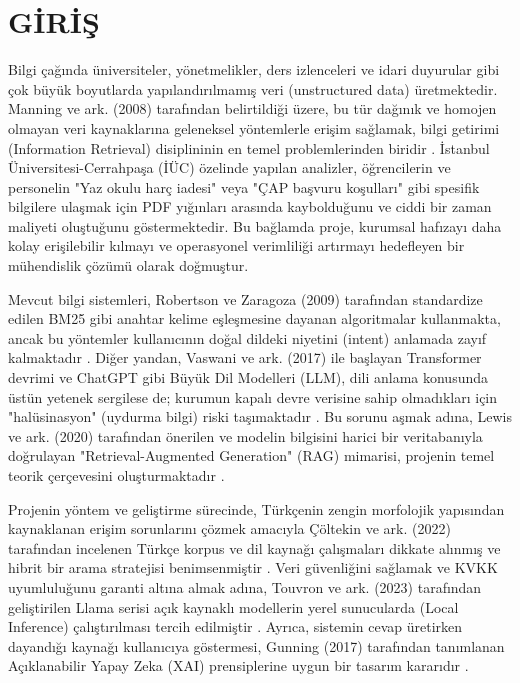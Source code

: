 \documentclass[12pt,a4paper]{report}
\begin{document}
\chapter{GİRİŞ}

Bilgi çağında üniversiteler, yönetmelikler, ders izlenceleri ve idari duyurular gibi çok büyük boyutlarda yapılandırılmamış veri (unstructured data) üretmektedir. Manning ve ark. (2008) tarafından belirtildiği üzere, bu tür dağınık ve homojen olmayan veri kaynaklarına geleneksel yöntemlerle erişim sağlamak, bilgi getirimi (Information Retrieval) disiplininin en temel problemlerinden biridir \cite{manning2008introduction}. İstanbul Üniversitesi-Cerrahpaşa (İÜC) özelinde yapılan analizler, öğrencilerin ve personelin "Yaz okulu harç iadesi" veya "ÇAP başvuru koşulları" gibi spesifik bilgilere ulaşmak için PDF yığınları arasında kaybolduğunu ve ciddi bir zaman maliyeti oluştuğunu göstermektedir. Bu bağlamda proje, kurumsal hafızayı daha kolay erişilebilir kılmayı ve operasyonel verimliliği artırmayı hedefleyen bir mühendislik çözümü olarak doğmuştur.

Mevcut bilgi sistemleri, Robertson ve Zaragoza (2009) tarafından standardize edilen BM25 gibi anahtar kelime eşleşmesine dayanan algoritmalar kullanmakta, ancak bu yöntemler kullanıcının doğal dildeki niyetini (intent) anlamada zayıf kalmaktadır \cite{robertson2009probabilistic}. Diğer yandan, Vaswani ve ark. (2017) ile başlayan Transformer devrimi ve ChatGPT gibi Büyük Dil Modelleri (LLM), dili anlama konusunda üstün yetenek sergilese de; kurumun kapalı devre verisine sahip olmadıkları için "halüsinasyon" (uydurma bilgi) riski taşımaktadır \cite{ji2023survey}. Bu sorunu aşmak adına, Lewis ve ark. (2020) tarafından önerilen ve modelin bilgisini harici bir veritabanıyla doğrulayan "Retrieval-Augmented Generation" (RAG) mimarisi, projenin temel teorik çerçevesini oluşturmaktadır \cite{lewis2020retrieval}.

Projenin yöntem ve geliştirme sürecinde, Türkçenin zengin morfolojik yapısından kaynaklanan erişim sorunlarını çözmek amacıyla Çöltekin ve ark. (2022) tarafından incelenen Türkçe korpus ve dil kaynağı çalışmaları dikkate alınmış ve hibrit bir arama stratejisi benimsenmiştir \cite{coltekin2022turkish}. Veri güvenliğini sağlamak ve KVKK uyumluluğunu garanti altına almak adına, Touvron ve ark. (2023) tarafından geliştirilen Llama serisi açık kaynaklı modellerin yerel sunucularda (Local Inference) çalıştırılması tercih edilmiştir \cite{touvron2023llama}. Ayrıca, sistemin cevap üretirken dayandığı kaynağı kullanıcıya göstermesi, Gunning (2017) tarafından tanımlanan Açıklanabilir Yapay Zeka (XAI) prensiplerine uygun bir tasarım kararıdır \cite{gunning2017explainable}.
\end{document}

